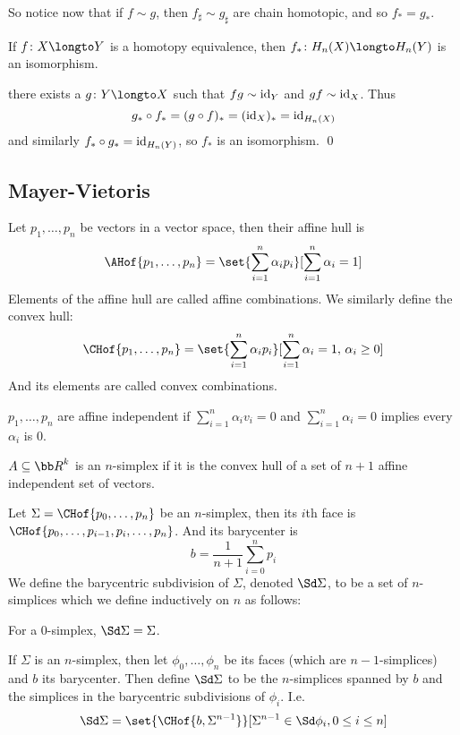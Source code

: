 So notice now that if $f\sim g$, then $f_\sharp\sim g_\sharp$ are chain homotopic, and so $f_*=g_*$.

\bcoro

    If $f\colon X\longto Y$ is a homotopy equivalence, then $f_*\colon H_n(X)\longto H_n(Y)$ is an isomorphism.

\ecoro

\Proof there exists a $g\colon Y\longto X$ such that $fg\sim{\rm id}_Y$ and $gf\sim{\rm id}_X$.
Thus
$$ g_*\circ f_* = (g\circ f)_* = ({\rm id}_X)_* = {\rm id}_{H_n(X)} $$
and similarly $f_*\circ g_*={\rm id}_{H_n(Y)}$, so $f_*$ is an isomorphism.
\qed

\subsection{Mayer-Vietoris}

\bdefn

    Let $p_1,\dots,p_n$ be vectors in a vector space, then their {\emphcolor affine hull} is
    $$ \AHof{p_1,\dots,p_n} = \set{\sum_{i=1}^n\alpha_ip_i}[\sum_{i=1}^n\alpha_i=1] $$
    Elements of the affine hull are called {\emphcolor affine combinations}.
    We similarly define the {\emphcolor convex hull}:
    $$ \CHof{p_1,\dots,p_n} = \set{\sum_{i=1}^n\alpha_ip_i}[\sum_{i=1}^n\alpha_i=1,\,\alpha_i\geq0] $$
    And its elements are called {\emphcolor convex combinations}.

\edefn

\bdefn

    $p_1,\dots,p_n$ are {\emphcolor affine independent} if $\sum_{i=1}^n\alpha_iv_i=0$ and $\sum_{i=1}^n\alpha_i=0$ implies every $\alpha_i$ is $0$.

\edefn

\bdefn

    $A\subseteq{\bb R}^k$ is an {\emphcolor $n$-simplex} if it is the convex hull of a set of $n+1$ affine independent set of vectors.

\edefn

\bdefn

    Let $\Sigma=\CHof{p_0,\dots,p_n}$ be an $n$-simplex, then its $i$th {\emphcolor face} is $\CHof{p_0,\dots,p_{i-1},p_i,\dots,p_n}$.
    And its {\emphcolor barycenter} is
    $$ b = \frac1{n+1}\sum_{i=0}^np_i $$
    We define the {\emphcolor barycentric subdivision} of $\Sigma$, denoted $\Sd\Sigma$, to be a set of $n$-simplices which we define inductively on $n$ as follows:
    \benum
        \item For a $0$-simplex, $\Sd\Sigma=\Sigma$.
        \item If $\Sigma$ is an $n$-simplex, then let $\phi_0,\dots,\phi_n$ be its faces (which are $n-1$-simplices) and $b$ its barycenter.
            Then define $\Sd\Sigma$ to be the $n$-simplices spanned by $b$ and the simplices in the barycentric subdivisions of $\phi_i$.
            I.e.
            $$ \Sd\Sigma = \set{\CHof{b,\Sigma^{n-1}}}[\Sigma^{n-1}\in\Sd\phi_i,0\leq i\leq n] $$
    \eenum

